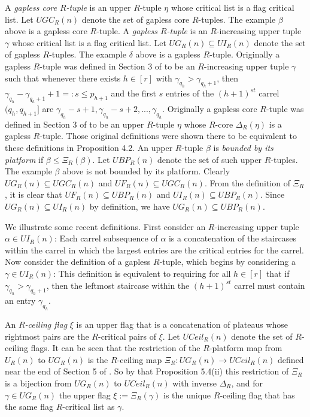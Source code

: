 \documentclass[11pt]{article}
\theoremstyle{definition}
\theoremstyle{remark}
\numberwithin{equation}{section}
\begin{document}
\begin{spacing}{1.35}
A \emph{gapless core $R$-tuple} is an upper $R$-tuple $\eta$ whose critical list is a flag critical list.  Let $UGC_R(n)$ denote the set of gapless core $R$-tuples.  The example $\beta$ above is a gapless core $R$-tuple.  A \emph{gapless $R$-tuple} is an $R$-increasing upper tuple $\gamma$ whose critical list is a flag critical list.  Let $UG_R(n) \subseteq UI_R(n)$ denote the set of gapless $R$-tuples.  The example $\delta$ above is a gapless $R$-tuple.  Originally a gapless $R$-tuple was defined in Section 3 of \cite{PW} to be an $R$-increasing upper tuple $\gamma$ such that whenever there exists $h \in [r]$ with $\gamma_{q_h} > \gamma_{q_h+1}$, then $\gamma_{q_h} - \gamma_{q_h+1} + 1 =: s \leq p_{h+1}$ and the first $s$ entries of the $(h+1)^{st}$ carrel $(q_h, q_{h+1} ]$ are $\gamma_{q_h}-s+1, \gamma_{q_h}-s+2, ... , \gamma_{q_h}$.  Originally a gapless core $R$-tuple was defined in Section 3 of \cite{PW} to be an upper $R$-tuple $\eta$ whose $R$-core $\Delta_R(\eta)$ is a gapless $R$-tuple.  Those original definitions were shown there to be equivalent to these definitions in Proposition 4.2.  An upper $R$-tuple $\beta$ is \emph{bounded by its platform} if $\beta \leq \Xi_R(\beta)$.  Let $UBP_R(n)$ denote the set of such upper $R$-tuples.  The example $\beta$ above is not bounded by its platform.  Clearly $UG_R(n) \subseteq UGC_R(n)$ and $UF_R(n) \subseteq UGC_R(n)$.  From the definition of $\Xi_R$, it is clear that $UF_R(n) \subseteq UBP_R(n)$ and $UI_R(n) \subseteq UBP_R(n)$.  Since $UG_R(n) \subseteq UI_R(n)$ by definition, we have $UG_R(n) \subseteq UBP_R(n)$.



We illustrate some recent definitions.  First consider an $R$-increasing upper tuple $\alpha \in UI_R(n)$:  Each carrel subsequence of $\alpha$ is a concatenation of the staircases within the carrel in which the largest entries are the critical entries for the carrel.  Now consider the definition of a gapless $R$-tuple, which begins by considering a $\gamma \in UI_R(n)$:  This definition is equivalent to requiring for all $h \in [r]$ that if $\gamma_{q_h} > \gamma_{q_{h}+1}$, then the leftmost staircase within the $(h+1)^{st}$ carrel must contain an entry $\gamma_{q_h}$.





An \emph{$R$-ceiling flag} $\xi$ is an upper flag that is a concatenation of plateaus whose rightmost pairs are the $R$-critical pairs of $\xi$.  Let $UCeil_R(n)$ denote the set of $R$-ceiling flags.  It can be seen that the restriction of the $R$-platform map from $U_R(n)$ to $UG_R(n)$ is the $R$-ceiling map $\Xi_R: UG_R(n) \rightarrow UCeil_R(n)$ defined near the end of Section 5 of \cite{PW}.  So by that Proposition 5.4(ii) this restriction of $\Xi_R$ is a bijection from $UG_R(n)$ to $UCeil_R(n)$ with inverse $\Delta_R$, and for $\gamma \in UG_R(n)$ the upper flag $\xi := \Xi_R(\gamma)$ is the unique $R$-ceiling flag that has the same flag $R$-critical list as $\gamma$.










\end{spacing}
\end{document}
